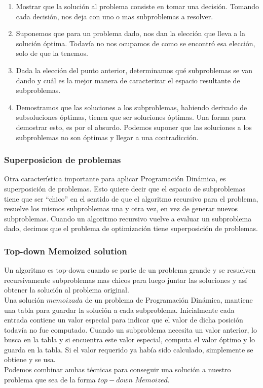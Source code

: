 \begin{enumerate}
 \item Mostrar que la solución al problema consiste en tomar una decisión. Tomando cada decisión, nos deja con uno o mas subproblemas a resolver.
 \item Suponemos que para un problema dado, nos dan la elección que lleva a la solución óptima. Todavía no nos ocupamos de como se encontró esa elección, solo de que la tenemos.
 \item Dada la elección del punto anterior, determinamos qué subproblemas se van dando y cuál es la mejor manera de caracterizar el espacio resultante de subproblemas.
 \item Demostramos que las soluciones a los subproblemas, habiendo derivado de subsoluciones óptimas, tienen que ser soluciones óptimas. Una forma para demostrar esto, es por el absurdo. Podemos suponer que las soluciones a los subproblemas no son óptimas y llegar a una contradicción. 
\end{enumerate}


\subsubsection{Superposicion de problemas}
\indent Otra característica importante para aplicar Programación Dinámica, es superposición de problemas. Esto quiere decir que el espacio de 
subproblemas tiene que ser ``chico'' en el sentido de que el algoritmo recursivo para el problema, resuelve los mismos subproblemas una y otra vez, en vez
de generar nuevos subproblemas. Cuando un algoritmo recursivo vuelve a evaluar un subproblema dado, decimos que el problema de optimización tiene superposición de problemas.

\subsubsection{Top-down Memoized solution}
\indent Un algoritmo es top-down cuando se parte de un problema grande y se resuelven recursivamente subproblemas mas chicos para luego juntar las soluciones y así obtener la solución al problema original.\\
\indent Una solución $memoizada$ de un problema de Programación Dinámica, mantiene una tabla para guardar la solución a cada subproblema. Inicialmente cada
entrada contiene un valor especial para indicar que el valor de dicha posición todavía no fue computado. Cuando un subproblema necesita un valor anterior,
lo busca en la tabla y si encuentra este valor especial, computa el valor óptimo y lo guarda en la tabla. Si el valor requerido ya había sido calculado, simplemente se obtiene y se usa.\\
\indent Podemos combinar ambas técnicas para conseguir una solución a nuestro problema que sea de la forma $top-down$ $Memoized$.











